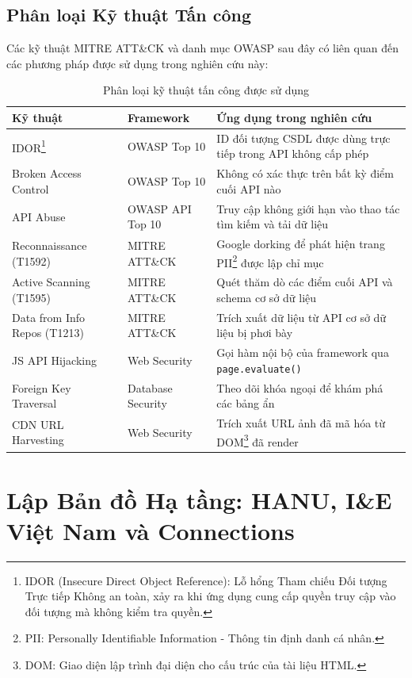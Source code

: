 \documentclass[12pt,a4paper]{article}
\begin{document}
\subsection{Phân loại Kỹ thuật Tấn công}

Các kỹ thuật MITRE ATT\&CK và danh mục OWASP sau đây có liên quan đến các phương pháp được sử dụng trong nghiên cứu này:

\begin{table}[H]
\centering
\caption{Phân loại kỹ thuật tấn công được sử dụng}
\begin{tabular}{@{}p{4cm}p{3cm}p{6cm}@{}}
\toprule
\textbf{Kỹ thuật} & \textbf{Framework} & \textbf{Ứng dụng trong nghiên cứu} \\
\midrule
IDOR\footnote{IDOR (Insecure Direct Object Reference): Lỗ hổng Tham chiếu Đối tượng Trực tiếp Không an toàn, xảy ra khi ứng dụng cung cấp quyền truy cập vào đối tượng mà không kiểm tra quyền.} & OWASP Top 10 & ID đối tượng CSDL được dùng trực tiếp trong API không cấp phép \\
Broken Access Control & OWASP Top 10 & Không có xác thực trên bất kỳ điểm cuối API nào \\
API Abuse & OWASP API Top 10 & Truy cập không giới hạn vào thao tác tìm kiếm và tải dữ liệu \\
Reconnaissance (T1592) & MITRE ATT\&CK & Google dorking để phát hiện trang PII\footnote{PII: Personally Identifiable Information - Thông tin định danh cá nhân.} được lập chỉ mục \\
Active Scanning (T1595) & MITRE ATT\&CK & Quét thăm dò các điểm cuối API và schema cơ sở dữ liệu \\
Data from Info Repos (T1213) & MITRE ATT\&CK & Trích xuất dữ liệu từ API cơ sở dữ liệu bị phơi bày \\
JS API Hijacking & Web Security & Gọi hàm nội bộ của framework qua \texttt{page.evaluate()} \\
Foreign Key Traversal & Database Security & Theo dõi khóa ngoại để khám phá các bảng ẩn \\
CDN URL Harvesting & Web Security & Trích xuất URL ảnh đã mã hóa từ DOM\footnote{DOM: Giao diện lập trình đại diện cho cấu trúc của tài liệu HTML.} đã render \\
\bottomrule
\end{tabular}
\end{table}

\section{Lập Bản đồ Hạ tầng: HANU, I\&E Việt Nam và Connections}
\label{sec:infra}
\end{document}
